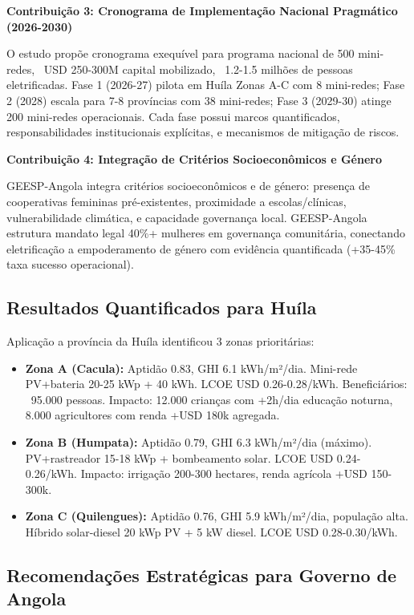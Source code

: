 \documentclass[12pt, a4paper]{article}
\begin{document}
\textbf{Contribuição 3: Cronograma de Implementação Nacional Pragmático (2026-2030)}

O estudo propõe cronograma exequível para programa nacional de 500 mini-redes, ~USD 250-300M capital mobilizado, ~1.2-1.5 milhões de pessoas eletrificadas. Fase 1 (2026-27) pilota em Huíla Zonas A-C com 8 mini-redes; Fase 2 (2028) escala para 7-8 províncias com 38 mini-redes; Fase 3 (2029-30) atinge 200 mini-redes operacionais. Cada fase possui marcos quantificados, responsabilidades institucionais explícitas, e mecanismos de mitigação de riscos.

\textbf{Contribuição 4: Integração de Critérios Socioeconômicos e Género}

GEESP-Angola integra critérios socioeconômicos e de género: presença de cooperativas femininas pré-existentes, proximidade a escolas/clínicas, vulnerabilidade climática, e capacidade governança local. GEESP-Angola estrutura mandato legal 40\%+ mulheres em governança comunitária, conectando eletrificação a empoderamento de género com evidência quantificada (+35-45\% taxa sucesso operacional).

\subsection{Resultados Quantificados para Huíla}

Aplicação a província da Huíla identificou 3 zonas prioritárias:

\begin{itemize}
\item \textbf{Zona A (Cacula):} Aptidão 0.83, GHI 6.1 kWh/m²/dia. Mini-rede PV+bateria 20-25 kWp + 40 kWh. LCOE USD 0.26-0.28/kWh. Beneficiários: ~95.000 pessoas. Impacto: 12.000 crianças com +2h/dia educação noturna, 8.000 agricultores com renda +USD 180k agregada.

\item \textbf{Zona B (Humpata):} Aptidão 0.79, GHI 6.3 kWh/m²/dia (máximo). PV+rastreador 15-18 kWp + bombeamento solar. LCOE USD 0.24-0.26/kWh. Impacto: irrigação 200-300 hectares, renda agrícola +USD 150-300k.

\item \textbf{Zona C (Quilengues):} Aptidão 0.76, GHI 5.9 kWh/m²/dia, população alta. Híbrido solar-diesel 20 kWp PV + 5 kW diesel. LCOE USD 0.28-0.30/kWh.
\end{itemize}

\subsection{Recomendações Estratégicas para Governo de Angola}
\end{document}
